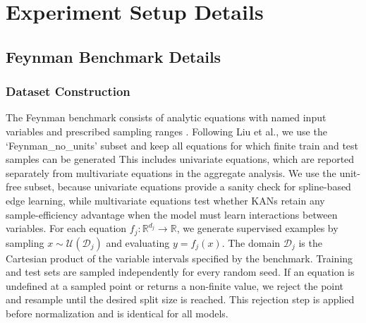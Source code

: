 \documentclass{article}
\begin{document}







\clearpage
\appendix

\section{Experiment Setup Details}

\subsection{Feynman Benchmark Details}

\subsubsection{Dataset Construction}

The Feynman benchmark consists of analytic equations with named input variables and prescribed sampling ranges \cite{udrescu2020aifeynman,udrescu2020aifeynman2}.
Following Liu et al., we use the `Feynman\_no\_units' subset and keep all equations for which finite train and test samples can be generated \cite{liu2024kan}
This includes univariate equations, which are reported separately from multivariate equations in the aggregate analysis.
We use the unit-free subset, because univariate equations provide a sanity check for spline-based edge learning, while multivariate equations test whether KANs retain any sample-efficiency advantage when the model must learn interactions between variables.
For each equation $f_j:\mathbb{R}^{d_j}\rightarrow\mathbb{R}$, we generate supervised examples by sampling $x\sim\mathcal{U}(\mathcal{D}_j)$ and evaluating $y=f_j(x)$.
The domain $\mathcal{D}_j$ is the Cartesian product of the variable intervals specified by the benchmark.
Training and test sets are sampled independently for every random seed.
If an equation is undefined at a sampled point or returns a non-finite value, we reject the point and resample until the desired split size is reached.
This rejection step is applied before normalization and is identical for all models.
\end{document}
